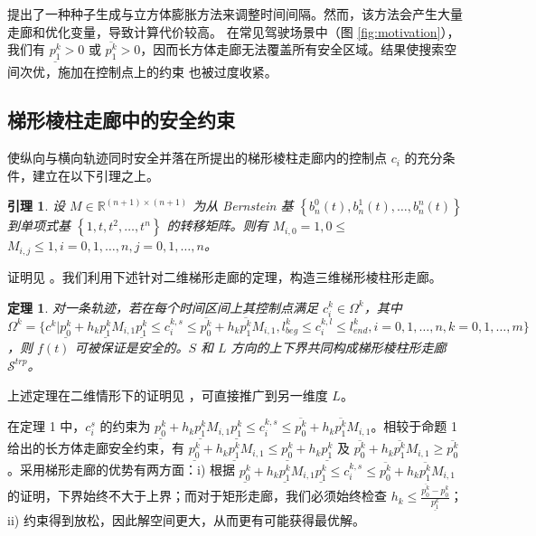 \documentclass[UTF8,a4paper,12pt,fontset=none]{ctexart}
\theoremstyle{definition}
\theoremstyle{plain}
\theoremstyle{plain}
\newtheorem{lemma}{引理}
\theoremstyle{plain}
\newtheorem{theorem}{定理}
\begin{document}
\citet{ding_safe_2019} 提出了一种种子生成与立方体膨胀方法来调整时间间隔。然而，该方法会产生大量走廊和优化变量，导致计算代价较高。%
在常见驾驶场景中（图 \ref{fig:motivation}），我们有 $\underline{p_{1}^{k}} > 0$ 或 $\overline{p_{1}^{k}} > 0$，因而长方体走廊无法覆盖所有安全区域。结果使搜索空间次优，施加在控制点上的约束%
也被过度收紧。

\subsection{梯形棱柱走廊中的安全约束}
使纵向与横向轨迹同时安全并落在所提出的梯形棱柱走廊内的控制点 $c_i$ 的充分条件，建立在以下引理之上。

\begin{lemma}
设 $M \in \mathbb{R}^{(n+1) \times(n+1)}$ 为从 Bernstein 基 $\left\{b_{n}^{0}(t), b_{n}^{1}(t), \ldots, b_{n}^{n}(t)\right\}$ 到单项式基 $\left\{1, t, t^{2}, \ldots, t^{n}\right\}$ 的转移矩阵。则有 $M_{i, 0}=1,0 \leq$ $M_{i, j} \leq 1, i=0,1, \ldots, n, j=0,1, \ldots, n$。
\end{lemma}
证明见 \cite{li_motion_nodate}。我们利用下述针对二维梯形走廊的定理，构造三维梯形棱柱形走廊。
\begin{theorem}
对一条轨迹，若在每个时间区间上其控制点满足 $c_{i}^k \in \Omega^k$，其中 $\Omega^k = \{c^k | \underline{p_{0}^{k}}+h_{k}\underline{p_{1}^{k}}M_{i,1} \underline{p_{1}^{k}} \leq c_{i}^{k,s} \leq \overline{p_{0}^{k}}+h_{k}\overline{p_{1}^{k}}M_{i,1}, l^{k}_{beg} \leq c_{i}^{k,l} \leq l^{k}_{end}, i=0,1,\ldots,n,k=0,1,\ldots,m\}$，则 $f(t)$ 可被保证是安全的。$S$ 和 $L$ 方向的上下界共同构成梯形棱柱形走廊 $\mathcal{S}^{trp}$。
\end{theorem}
上述定理在二维情形下的证明见 \cite{li_motion_nodate}，可直接推广到另一维度 $L$。

在定理 1 中，$c_{i}^{s}$ 的约束为 $\underline{p_{0}^{k}}+h_{k}\underline{p_{1}^{k}}M_{i,1} \underline{p_{1}^{k}} \leq c_{i}^{k,s} \leq \overline{p_{0}^{k}}+h_{k}\overline{p_{1}^{k}}M_{i,1}$。相较于命题 1 给出的长方体走廊安全约束，有 $\underline{p_{0}^{k}}+h_{k}\underline{p_{1}^{k}}M_{i,1} \leq \underline{p_{0}^{k}}+h_{k} \underline{p_{1}^{k}}$ 及 $\overline{p_{0}^{k}}+h_{k}\overline{p_{1}^{k}}M_{i,1} \geq \overline{p_{0}^{k}}$。采用梯形走廊的优势有两方面：i) 根据 $\underline{p_{0}^{k}}+h_{k}\underline{p_{1}^{k}}M_{i,1} \underline{p_{1}^{k}} \leq c_{i}^{k,s} \leq \overline{p_{0}^{k}}+h_{k}\overline{p_{1}^{k}}M_{i,1}$ 的证明，下界始终不大于上界；而对于矩形走廊，我们必须始终检查 $h_{k} \leq \frac{\overline{p_{0}^{k}}-p_{0}^{k}}{\underline{p_{1}^{k}}}$；ii) 约束得到放松，因此解空间更大，从而更有可能获得最优解。
\end{document}
